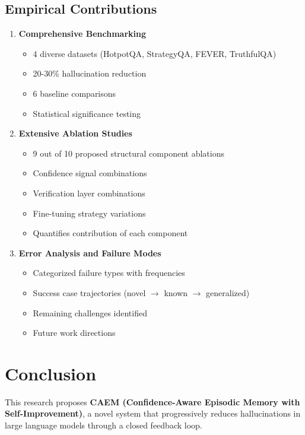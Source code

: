 \documentclass[12pt,a4paper]{article}
\theoremstyle{definition}
\begin{document}
\subsection{Empirical Contributions}

\begin{enumerate}
    \item \textbf{Comprehensive Benchmarking}
    \begin{itemize}
        \item 4 diverse datasets (HotpotQA, StrategyQA, FEVER, TruthfulQA)
        \item 20-30\% hallucination reduction
        \item 6 baseline comparisons
        \item Statistical significance testing
    \end{itemize}
    
    \item \textbf{Extensive Ablation Studies}
    \begin{itemize}
        \item 9 out of 10 proposed structural component ablations
        \item Confidence signal combinations
        \item Verification layer combinations
        \item Fine-tuning strategy variations
        \item Quantifies contribution of each component
    \end{itemize}
    
    \item \textbf{Error Analysis and Failure Modes}
    \begin{itemize}
        \item Categorized failure types with frequencies
        \item Success case trajectories (novel $\rightarrow$ known $\rightarrow$ generalized)
        \item Remaining challenges identified
        \item Future work directions
    \end{itemize}
\end{enumerate}

\newpage

\section{Conclusion}

This research proposes \textbf{CAEM (Confidence-Aware Episodic Memory with Self-Improvement)}, a novel system that progressively reduces hallucinations in large language models through a closed feedback loop.
\end{document}
